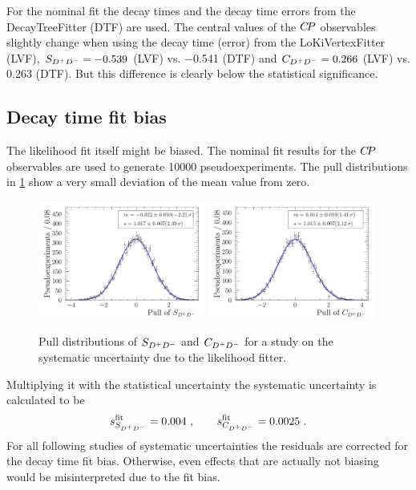 For the nominal fit the decay times and the decay time errors from the
DecayTreeFitter (DTF) are used. The central values of the ${C\!P}$ observables
slightly change when using the decay time (error) from the LoKiVertexFitter
(LVF), $S_{{{D}^+}{{D}^-}} = \num{-0.539}$ (LVF) vs. \num{-0.541} (DTF) and $C_{{{D}^+}{{D}^-}} =
\num{0.266}$ (LVF) vs. \num{0.263} (DTF). But this difference is clearly below
the statistical significance.

\FloatBarrier

\subsection{Decay time fit bias}
\label{sec:b02dd:systematics:fitbias}

The likelihood fit itself might be biased. The nominal fit results for the
${C\!P}$ observables are used to generate \num{10000} pseudoexperiments. The pull
distributions in \cref{fig:b02dd:systematics:fitbias:pulls} show a very small
deviation of the mean value from zero.
%
\begin{figure}[htb]
\includegraphics[width=0.49\textwidth]{07-B02DD/tikz/pdf/parSigTimeSin2b_pull_fitbias.pdf}
\includegraphics[width=0.49\textwidth]{07-B02DD/tikz/pdf/parSigTimeC_pull_fitbias.pdf}
\caption{Pull distributions of $S_{{{D}^+}{{D}^-}}$ and $C_{{{D}^+}{{D}^-}}$ for a study on the systematic
uncertainty due to the likelihood fitter.}
\label{fig:b02dd:systematics:fitbias:pulls}
\end{figure}
%
Multiplying it with the statistical uncertainty the systematic uncertainty is
calculated to be
\begin{align}
s_{S_{{{D}^+}{{D}^-}}}^{\textrm{fit}} = \num{0.004}\ , \qquad s_{C_{{{D}^+}{{D}^-}}}^{\textrm{fit}} = \num{0.0025}\ .
\end{align}
For all following studies of systematic uncertainties the residuals are
corrected for the decay time fit bias. Otherwise, even effects that are
actually not biasing would be misinterpreted due to the fit bias.

